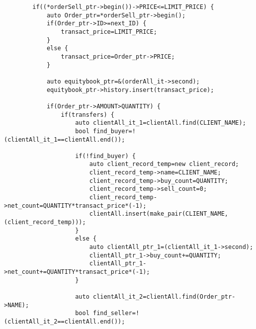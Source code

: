 \documentclass{article}
\begin{document}
\begin{spacing}{1.5}
\begin{lstlisting}
        if((*orderSell_ptr->begin())->PRICE<=LIMIT_PRICE) {
            auto Order_ptr=*orderSell_ptr->begin();
            if(Order_ptr->ID>=next_ID) {
                transact_price=LIMIT_PRICE;
            }
            else {
                transact_price=Order_ptr->PRICE;
            }

            auto equitybook_ptr=&(orderAll_it->second);
            equitybook_ptr->history.insert(transact_price);

            if(Order_ptr->AMOUNT>QUANTITY) {
                if(transfers) {
                    auto clientAll_it_1=clientAll.find(CLIENT_NAME);
                    bool find_buyer=!(clientAll_it_1==clientAll.end());

                    if(!find_buyer) {
                        auto client_record_temp=new client_record;
                        client_record_temp->name=CLIENT_NAME;
                        client_record_temp->buy_count=QUANTITY;
                        client_record_temp->sell_count=0;
                        client_record_temp->net_count=QUANTITY*transact_price*(-1);
                        clientAll.insert(make_pair(CLIENT_NAME, (client_record_temp)));
                    }
                    else {
                        auto clientAll_ptr_1=(clientAll_it_1->second);
                        clientAll_ptr_1->buy_count+=QUANTITY;
                        clientAll_ptr_1->net_count+=QUANTITY*transact_price*(-1);
                    }

                    auto clientAll_it_2=clientAll.find(Order_ptr->NAME);
                    bool find_seller=!(clientAll_it_2==clientAll.end());


\end{lstlisting}
\end{spacing}
\end{document}
